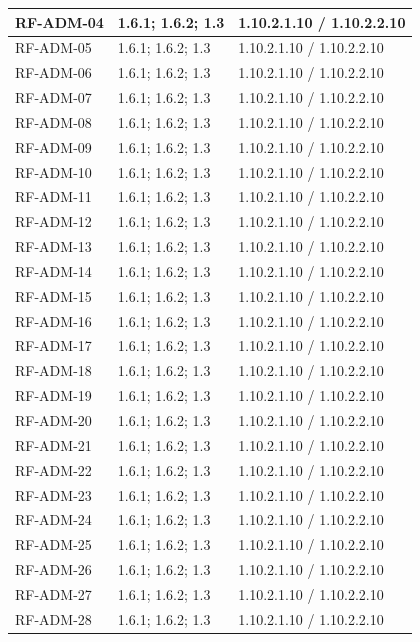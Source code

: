 \begin{longtable}{L{23mm}L{46mm}L{72mm}}
RF-ADM-04 & 1.6.1; 1.6.2; 1.3 & 1.10.2.1.10 / 1.10.2.2.10\\\hline
RF-ADM-05 & 1.6.1; 1.6.2; 1.3 & 1.10.2.1.10 / 1.10.2.2.10\\\hline
RF-ADM-06 & 1.6.1; 1.6.2; 1.3 & 1.10.2.1.10 / 1.10.2.2.10\\\hline
RF-ADM-07 & 1.6.1; 1.6.2; 1.3 & 1.10.2.1.10 / 1.10.2.2.10\\\hline
RF-ADM-08 & 1.6.1; 1.6.2; 1.3 & 1.10.2.1.10 / 1.10.2.2.10\\\hline
RF-ADM-09 & 1.6.1; 1.6.2; 1.3 & 1.10.2.1.10 / 1.10.2.2.10\\\hline
RF-ADM-10 & 1.6.1; 1.6.2; 1.3 & 1.10.2.1.10 / 1.10.2.2.10\\\hline
RF-ADM-11 & 1.6.1; 1.6.2; 1.3 & 1.10.2.1.10 / 1.10.2.2.10\\\hline
RF-ADM-12 & 1.6.1; 1.6.2; 1.3 & 1.10.2.1.10 / 1.10.2.2.10\\\hline
RF-ADM-13 & 1.6.1; 1.6.2; 1.3 & 1.10.2.1.10 / 1.10.2.2.10\\\hline
RF-ADM-14 & 1.6.1; 1.6.2; 1.3 & 1.10.2.1.10 / 1.10.2.2.10\\\hline
RF-ADM-15 & 1.6.1; 1.6.2; 1.3 & 1.10.2.1.10 / 1.10.2.2.10\\\hline
RF-ADM-16 & 1.6.1; 1.6.2; 1.3 & 1.10.2.1.10 / 1.10.2.2.10\\\hline
RF-ADM-17 & 1.6.1; 1.6.2; 1.3 & 1.10.2.1.10 / 1.10.2.2.10\\\hline
RF-ADM-18 & 1.6.1; 1.6.2; 1.3 & 1.10.2.1.10 / 1.10.2.2.10\\\hline
RF-ADM-19 & 1.6.1; 1.6.2; 1.3 & 1.10.2.1.10 / 1.10.2.2.10\\\hline
RF-ADM-20 & 1.6.1; 1.6.2; 1.3 & 1.10.2.1.10 / 1.10.2.2.10\\\hline
RF-ADM-21 & 1.6.1; 1.6.2; 1.3 & 1.10.2.1.10 / 1.10.2.2.10\\\hline
RF-ADM-22 & 1.6.1; 1.6.2; 1.3 & 1.10.2.1.10 / 1.10.2.2.10\\\hline
RF-ADM-23 & 1.6.1; 1.6.2; 1.3 & 1.10.2.1.10 / 1.10.2.2.10\\\hline
RF-ADM-24 & 1.6.1; 1.6.2; 1.3 & 1.10.2.1.10 / 1.10.2.2.10\\\hline
RF-ADM-25 & 1.6.1; 1.6.2; 1.3 & 1.10.2.1.10 / 1.10.2.2.10\\\hline
RF-ADM-26 & 1.6.1; 1.6.2; 1.3 & 1.10.2.1.10 / 1.10.2.2.10\\\hline
RF-ADM-27 & 1.6.1; 1.6.2; 1.3 & 1.10.2.1.10 / 1.10.2.2.10\\\hline
RF-ADM-28 & 1.6.1; 1.6.2; 1.3 & 1.10.2.1.10 / 1.10.2.2.10\\\hline

\end{longtable}
